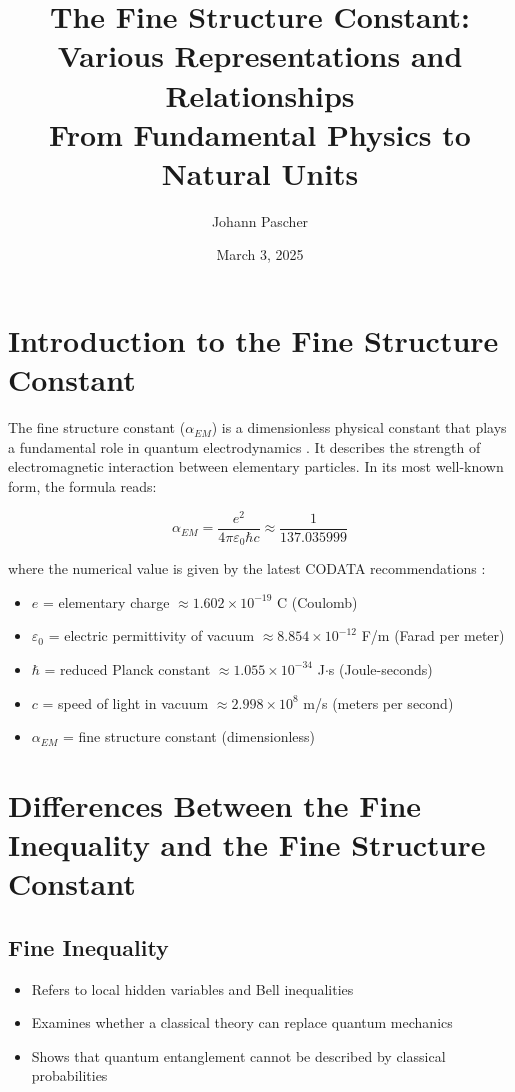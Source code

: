 \documentclass[12pt,a4paper]{article}
\begin{document}
	
	\title{The Fine Structure Constant: Various Representations and Relationships \\
		From Fundamental Physics to Natural Units}
	\author{Johann Pascher}
	\date{March 3, 2025}
	
	\maketitle
	\tableofcontents
	\section{Introduction to the Fine Structure Constant}
	
	The fine structure constant ($\alpha_{EM}$) is a dimensionless physical constant that plays a fundamental role in quantum electrodynamics \cite{Jackson1999}. It describes the strength of electromagnetic interaction between elementary particles. In its most well-known form, the formula reads:
	
	\begin{equation}
		\alpha_{EM} = \frac{e^2}{4\pi\varepsilon_0\hbar c} \approx \frac{1}{137.035999}
	\end{equation}
	
	where the numerical value is given by the latest CODATA recommendations \cite{Mohr2016}:
	\begin{itemize}
		\item $e$ = elementary charge $\approx 1.602 \times 10^{-19}$ C (Coulomb)
		\item $\varepsilon_0$ = electric permittivity of vacuum $\approx 8.854 \times 10^{-12}$ F/m (Farad per meter)
		\item $\hbar$ = reduced Planck constant $\approx 1.055 \times 10^{-34}$ J$\cdot$s (Joule-seconds)
		\item $c$ = speed of light in vacuum $\approx 2.998 \times 10^8$ m/s (meters per second)
		\item $\alpha_{EM}$ = fine structure constant (dimensionless)
	\end{itemize}
	
	\section{Differences Between the Fine Inequality and the Fine Structure Constant}
	
	\subsection{Fine Inequality}
	\begin{itemize}
		\item Refers to local hidden variables and Bell inequalities
		\item Examines whether a classical theory can replace quantum mechanics
		\item Shows that quantum entanglement cannot be described by classical probabilities
	\end{itemize}
	
\end{document}
